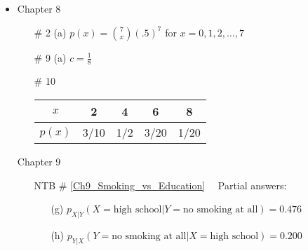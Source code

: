 \documentclass[12pt]{article}
\begin{document}
\begin{itemize}
\item Chapter 8          \label{ANS_8}
	\begin{itemize}
	\item[\# 2]  (a) $p(x)=\binom{7}{x}(.5)^7$ for $x=0,1,2,\ldots,7$
	\item[\# 9] (a) $c = \frac{1}{8}$
	\item[\# 10]  \ \ 
        	\begin{center}
        	\begin{tabular}{|c|c|c|c|c|}
        	\hline	
        	$x$ & 2 & 4 & 6 & 8\\
        	\hline
        	$p(x)$ & 3/10 & 1/2 & 3/20 & 1/20\\
        	\hline
        	\end{tabular}
        	\end{center}
	\end{itemize}

\item[] Chapter 9           \label{ANS_9}
\begin{itemize}
     \item[NTB \# \ref{Ch9_Smoking_vs_Education}]  \ \ Partial answers: 
	\begin{itemize}
	\item[(g)] $p_{X|Y}(X=\text{high school}| Y=\text{no smoking at all}) = 0.476$ 
	\item[(h)]  $p_{Y|X}( Y=\text{no smoking at all}|X=\text{high school}) = 0.200$ 
	\end{itemize}
\end{itemize}





\end{itemize}
\end{document}
